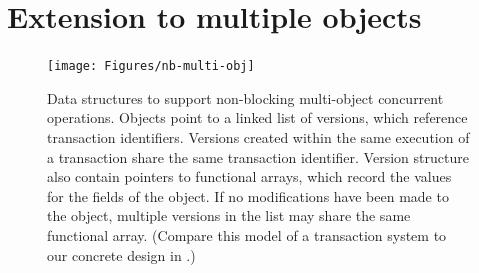 \section{Extension to multiple objects}
\begin{figure}\centering
\texttt{[image: Figures/nb-multi-obj]}
\caption[Data structures to support non-blocking multi-object
  concurrent operations.]{Data structures to support non-blocking multi-object
  concurrent operations.  Objects point to a linked list of versions,
  which reference transaction identifiers.  Versions created within the
  same execution of a transaction share the same transaction
  identifier.  Version structure also contain pointers to functional
  arrays, which record the values for the fields of the object.
  If no modifications have been made to the object, multiple versions
  in the list may share the same functional array.  (Compare this model
  of a transaction system to our concrete design in .)}
\label{fig:multi-o}
\end{figure}

